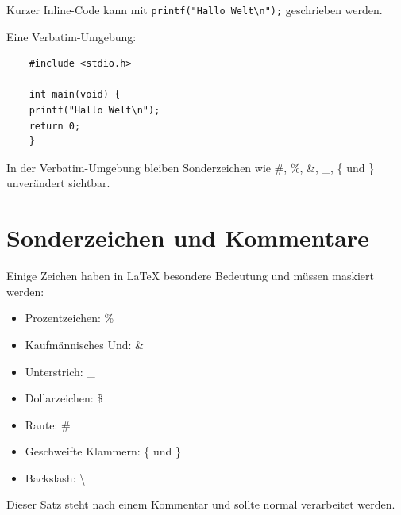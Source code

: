 \documentclass[a4paper,12pt]{article}
\begin{document}
	Kurzer Inline-Code kann mit \verb|printf("Hallo Welt\n");| geschrieben werden.

	Eine Verbatim-Umgebung:

	\begin{verbatim}
	#include <stdio.h>

	int main(void) {
	printf("Hallo Welt\n");
	return 0;
	}
\end{verbatim}

In der Verbatim-Umgebung bleiben Sonderzeichen wie \#, \%, \&, \_, \{ und \}
unverändert sichtbar.

\section{Sonderzeichen und Kommentare}

Einige Zeichen haben in LaTeX besondere Bedeutung und müssen maskiert werden:

\begin{itemize}
	\item Prozentzeichen: \%
	\item Kaufmännisches Und: \&
	\item Unterstrich: \_
	\item Dollarzeichen: \$
	\item Raute: \#
	\item Geschweifte Klammern: \{ und \}
	\item Backslash: \textbackslash
\end{itemize}


Dieser Satz steht nach einem Kommentar und sollte normal verarbeitet werden.
\end{document}
